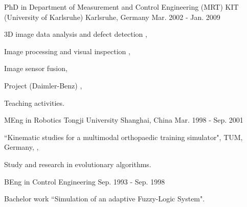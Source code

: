 \documentclass[../resume_xin.tex]{subfiles}
\begin{document}
\begin{cventries}
  \cventry
    {PhD in Department of Measurement and Control Engineering (MRT)} %
    {KIT (University of Karlsruhe)} %
    {Karlsruhe, Germany} %
    {Mar. 2002 - Jan. 2009} %
    {
      \begin{cvitems} %
        \item 3D image data analysis and defect detection \supercite{xin2008diss},
        \item Image processing and visual inspection \supercite{xin2009multiscale},
        \item Image sensor fusion,
        \item Project (Daimler-Benz) \supercite{Xin_Daimler_08},
        \item Teaching activities.
      \end{cvitems}
    }

  \cventry
    {MEng in Robotics} %
    {Tongji University} %
    {Shanghai, China} %
    {Mar. 1998 - Sep. 2001} %
    {
      \begin{cvitems} %
        \item ``Kinematic studies for a multimodal orthopaedic training simulator", TUM, Germany, \supercite{xin2002KneeSimulator},
        \item Study and research in evolutionary algorithms.
      \end{cvitems}
    }

  \cventry
    {BEng in Control Engineering} %
    {} %
    {} %
    {Sep. 1993 - Sep. 1998} %
    {
      \begin{cvitems} %
        \item Bachelor work ``Simulation of an adaptive Fuzzy-Logic System".
      \end{cvitems}
    }

\end{cventries}
\end{document}
